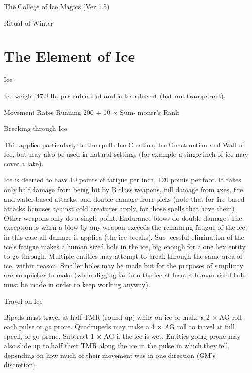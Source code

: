 \begin{Chapter}{The College of Ice Magics (Ver 1.5)}
\begin{ritual}[R-3]{Ritual of Winter }
\begin{effects}
\end{effects}
\end{ritual}

\section{The Element of Ice}

Ice 

Ice weighs 47.2 lb. per cubic foot and is translucent 
(but not transparent). 

Movement  Rates  Running  200  +  10  ×  Sum-
moner’s Rank 

Breaking through Ice 

This applies particularly to the spells  Ice Creation, 
Ice Construction and Wall of  Ice, but may also be 
used  in  natural  settings  (for  example  a  single  inch 
of ice may cover a lake). 

Ice is deemed to have 10 points of fatigue per inch, 
120 points per foot. It takes only half damage from 
being  hit  by  B  class  weapons,  full  damage  from 
axes,  fire  and  water  based  attacks,  and  double 
damage from picks (note that for fire based attacks 
bonuses  against  cold  creatures  apply,  for  those 
spells  that  have  them).  Other  weapons  only  do  a 
single  point.  Endurance  blows  do  double  damage. 
The  exception  is  when  a  blow  by  any  weapon 
exceeds  the  remaining  fatigue  of  the  ice;  in  this 
case  all  damage  is  applied  (the  ice  breaks).  Suc-
cessful  elimination  of  the  ice’s  fatigue  makes  a 
human  sized  hole  in  the  ice, big  enough  for  a  one 
hex  entity  to  go  through.  Multiple  entities  may 
attempt  to  break  through  the  same  area  of  ice, 
within  reason.  Smaller  holes  may  be  made  but  for 
the  purposes  of  simplicity  are  no  quicker  to  make 
(when  digging  far  into  the  ice  at  least  a  human 
sized hole must be made in order to keep working 
anyway). 

Travel on Ice 

Bipeds  must  travel  at  half  TMR  (round  up)  while 
on  ice  or  make  a  2  ×  AG  roll  each  pulse  or  go 
prone.  Quadrupeds  may  make  a  4  ×  AG  roll  to 
travel at full speed, or go prone. Subtract 1 × AG if 
the  ice  is  wet.  Entities  going  prone may  also  slide 
up to  half  their  TMR  along  the  ice  in  the  pulse  in 
which  they  fell,  depending  on  how  much  of  their 
movement was in one direction (GM’s discretion). 


\end{Chapter}
